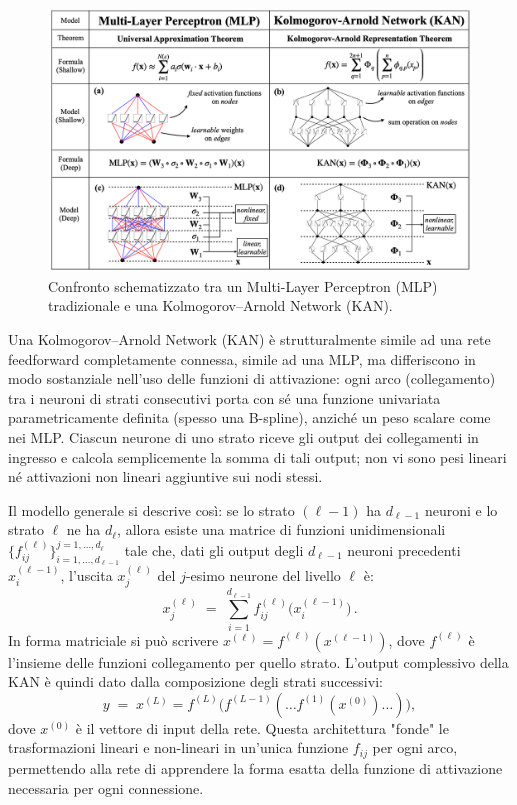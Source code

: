 \documentclass[a4paper,12pt]{report}
\begin{document}
	\begin{figure}[H]
		\centering
		\includegraphics[width=1.0\textwidth]{img/KANvsMLP.png}
		\caption{Confronto schematizzato tra un Multi-Layer Perceptron (MLP) tradizionale e una Kolmogorov–Arnold Network (KAN).}
		\label{fig:KANvsMLP}
	\end{figure}
	Una Kolmogorov–Arnold Network (KAN) è strutturalmente simile ad una rete feedforward completamente connessa, simile ad una MLP, ma differiscono in modo sostanziale nell'uso delle funzioni di attivazione: ogni arco (collegamento) tra i neuroni di strati consecutivi porta con sé una funzione univariata parametricamente definita (spesso una B-spline), anziché un peso scalare come nei MLP. Ciascun neurone di uno strato riceve gli output dei collegamenti in ingresso e calcola semplicemente la somma di tali output; non vi sono pesi lineari né attivazioni non lineari aggiuntive sui nodi stessi.
	
	Il modello generale si descrive così: se lo strato $(\ell-1)$ ha $d_{\ell-1}$ neuroni e lo strato $\ell$ ne ha $d_\ell$, allora esiste una matrice di funzioni unidimensionali $\{f^{(\ell)}_{ij}\}_{i=1,\dots,d_{\ell-1}}^{j=1,\dots,d_\ell}$ tale che, dati gli output degli $d_{\ell-1}$ neuroni precedenti $x_i^{(\ell-1)}$, l’uscita $x_j^{(\ell)}$ del $j$-esimo neurone del livello $\ell$ è: 
	\[
	x_j^{(\ell)} \;=\; \sum_{i=1}^{d_{\ell-1}} f^{(\ell)}_{ij}\bigl(x_i^{(\ell-1)}\bigr)\,.
	\] 
	In forma matriciale si può scrivere $x^{(\ell)} = f^{(\ell)}(x^{(\ell-1)})$, dove $f^{(\ell)}$ è l’insieme delle funzioni collegamento per quello strato. L’output complessivo della KAN è quindi dato dalla composizione degli strati successivi: 
	\[
	y \;=\; x^{(L)} 
	= f^{(L)}\bigl(f^{(L-1)}(\dots f^{(1)}(x^{(0)})\dots)\bigr)\!,
	\] 
	dove $x^{(0)}$ è il vettore di input della rete. Questa architettura "fonde" le trasformazioni lineari e non-lineari in un'unica funzione $f_{ij}$ per ogni arco, permettendo alla rete di apprendere la forma esatta della funzione di attivazione necessaria per ogni connessione.
	
\end{document}
